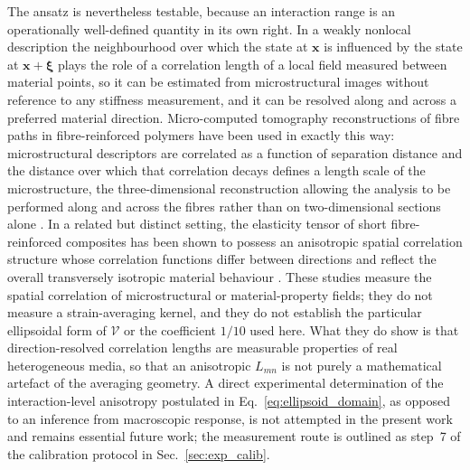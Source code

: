 \documentclass[final,3p,times,fleqn]{elsarticle}
\begin{document}
The ansatz is nevertheless testable, because an interaction
range is an operationally well-defined quantity in its own right. In a
weakly nonlocal description the neighbourhood over which the state at
$\mathbf{x}$ is influenced by the state at $\mathbf{x}+\boldsymbol{\xi}$
plays the role of a correlation length of a local field measured between
material points, so it can be estimated from microstructural images
without reference to any stiffness measurement, and it can be resolved
along and across a preferred material direction. Micro-computed
tomography reconstructions of fibre paths in fibre-reinforced polymers
have been used in exactly this way: microstructural descriptors are
correlated as a function of separation distance and the distance over
which that correlation decays defines a length scale of the
microstructure, the three-dimensional reconstruction allowing the
analysis to be performed along and across the fibres rather than on
two-dimensional sections alone \cite{Schey2019,ScheyStapleton2022}. In a
related but distinct setting, the elasticity tensor of short
fibre-reinforced composites has been shown to possess an anisotropic
spatial correlation structure whose correlation functions differ between
directions and reflect the overall transversely isotropic material
behaviour \cite{RauterLammering2020}. These studies measure the spatial
correlation of microstructural or material-property fields; they do not
measure a strain-averaging kernel, and they do not establish the
particular ellipsoidal form of $\mathcal{V}$ or the coefficient $1/10$
used here. What they do show is that direction-resolved correlation
lengths are measurable properties of real heterogeneous media, so that
an anisotropic $L_{mn}$ is not purely a mathematical artefact of the
averaging geometry. A direct experimental determination of the
interaction-level anisotropy postulated in Eq.~\eqref{eq:ellipsoid_domain},
as opposed to an inference from macroscopic response, is not attempted in
the present work and remains essential future work; the measurement
route is outlined as step~7 of the calibration protocol in
Sec.~\ref{sec:exp_calib}.
\end{document}
